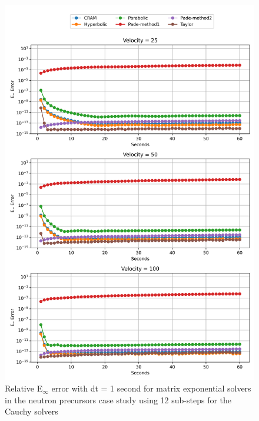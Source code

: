 \begin{figure}[p]
    \centering
    \includegraphics[width=5in]{images/chapter-5/caseStudies/neutronPrecursors/dt1/neutronPrecursorsEinfErrorerrorSteps12.png}
    \caption{Relative E$_{\infty}$ error with dt = 1 second for matrix exponential solvers in the neutron precursors case study using 12 sub-steps for the Cauchy solvers}
    \label{fig:neutron_precursors_Einf_dt1_steps12}
\end{figure}

\clearpage

